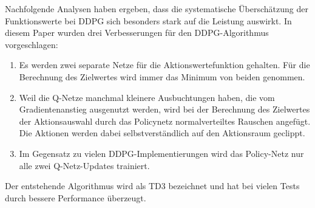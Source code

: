 Nachfolgende Analysen haben ergeben, dass die systematische Überschätzung der Funktionswerte bei DDPG sich besonders stark auf die Leistung auswirkt. \cite{DBLP:journals/corr/abs-1802-09477}
In diesem Paper wurden drei Verbesserungen für den DDPG-Algorithmus vorgeschlagen:
\begin{enumerate}
	\item Es werden zwei separate Netze für die Aktionswertefunktion gehalten.
	Für die Berechnung des Zielwertes wird immer das Minimum von beiden genommen.
	\item Weil die Q-Netze manchmal kleinere Ausbuchtungen haben, die vom Gradientenanstieg ausgenutzt werden, wird bei der Berechnung des Zielwertes der Aktionsauswahl durch das Policynetz normalverteiltes Rauschen angefügt.
	Die Aktionen werden dabei selbstverständlich auf den Aktionsraum geclippt.
	\item Im Gegensatz zu vielen DDPG-Implementierungen wird das Policy-Netz nur alle zwei Q-Netz-Updates trainiert.
\end{enumerate}
Der entstehende Algorithmus wird als TD3 bezeichnet und hat bei vielen Tests durch bessere Performance überzeugt.

